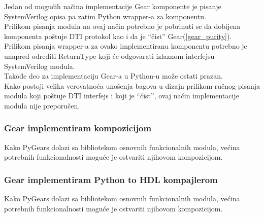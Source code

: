 Jedan od mogućih načina implementacije Gear komponente je pisanje SystemVerilog
opisa pa zatim Python wrapper-a za komponentu. \\
Prilikom pisanja modula na ovaj način potrebno je pobrinuti se da dobijena
komponenta poštuje DTI protokol kao i da je ``čist'' Gear(\ref{gear_purity}). \\

Prilikom pisanja wrapper-a za ovako implementiranu komponentu potrebno je
unapred odrediti ReturnType koji će odgovarati izlaznom interfejsu SystemVerilog modula. \\
Takođe deo za implementaciju Gear-a u Python-u može ostati prazan. \\

Kako postoji velika verovatnoća unošenja bagova u dizajn prilikom ručnog pisanja
modula koji poštuje DTI interfejs i koji je ``čist'', ovaj način implementacije
modula nije preporučen.

\subsubsection{Gear implementiram kompozicijom}

Kako PyGears dolazi sa bibliotekom osnovnih funkcionalnih modula, većina
potrebnih funkcionalnosti moguće je ostvariti njihovom kompozicijom. \\

\subsubsection{Gear implementiram Python to HDL kompajlerom}

Kako PyGears dolazi sa bibliotekom osnovnih funkcionalnih modula, većina
potrebnih funkcionalnosti moguće je ostvariti njihovom kompozicijom. \\